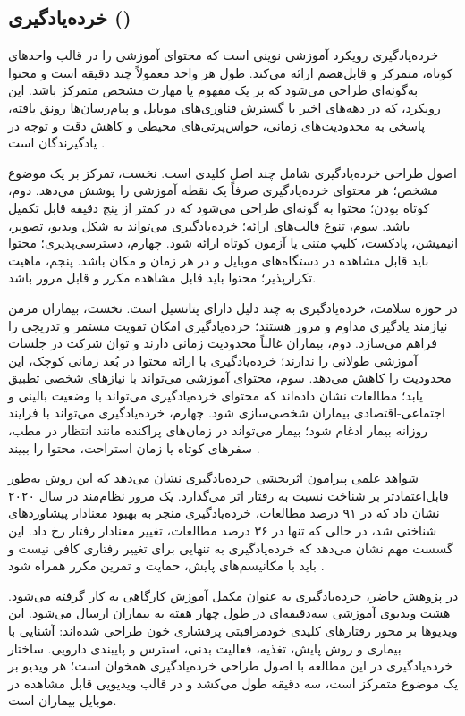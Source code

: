 \subsection{خرده‌یادگیری ()}
خرده‌یادگیری رویکرد آموزشی نوینی است که محتوای آموزشی را در قالب واحدهای کوتاه، متمرکز و قابل‌هضم ارائه می‌کند. طول هر واحد معمولاً چند دقیقه است و محتوا به‌گونه‌ای طراحی می‌شود که بر یک مفهوم یا مهارت مشخص متمرکز باشد. این رویکرد، که در دهه‌های اخیر با گسترش فناوری‌های موبایل و پیام‌رسان‌ها رونق یافته، پاسخی به محدودیت‌های زمانی، حواس‌پرتی‌های محیطی و کاهش دقت و توجه در یادگیرندگان است \cite{monib2024microlearning}.
\par
اصول طراحی خرده‌یادگیری شامل چند اصل کلیدی است. نخست، تمرکز بر یک موضوع مشخص؛ هر محتوای خرده‌یادگیری صرفاً یک نقطه آموزشی را پوشش می‌دهد. دوم، کوتاه بودن؛ محتوا به گونه‌ای طراحی می‌شود که در کمتر از پنج دقیقه قابل تکمیل باشد. سوم، تنوع قالب‌های ارائه؛ خرده‌یادگیری می‌تواند به شکل ویدیو، تصویر، انیمیشن، پادکست، کلیپ متنی یا آزمون کوتاه ارائه شود. چهارم، دسترسی‌پذیری؛ محتوا باید قابل مشاهده در دستگاه‌های موبایل و در هر زمان و مکان باشد. پنجم، ماهیت تکرارپذیر؛ محتوا باید قابل مشاهده مکرر و قابل مرور باشد.
\par
در حوزه سلامت، خرده‌یادگیری به چند دلیل دارای پتانسیل است. نخست، بیماران مزمن نیازمند یادگیری مداوم و مرور هستند؛ خرده‌یادگیری امکان تقویت مستمر و تدریجی را فراهم می‌سازد. دوم، بیماران غالباً محدودیت زمانی دارند و توان شرکت در جلسات آموزشی طولانی را ندارند؛ خرده‌یادگیری با ارائه محتوا در بُعد زمانی کوچک، این محدودیت را کاهش می‌دهد. سوم، محتوای آموزشی می‌تواند با نیازهای شخصی تطبیق یابد؛ مطالعات نشان داده‌اند که محتوای خرده‌یادگیری می‌تواند با وضعیت بالینی و اجتماعی-اقتصادی بیماران شخصی‌سازی شود. چهارم، خرده‌یادگیری می‌تواند با فرایند روزانه بیمار ادغام شود؛ بیمار می‌تواند در زمان‌های پراکنده مانند انتظار در مطب، سفرهای کوتاه یا زمان استراحت، محتوا را ببیند \cite{poorcheraghi2025microlearning,susman2024micropractice}.
\par
شواهد علمی پیرامون اثربخشی خرده‌یادگیری نشان می‌دهد که این روش به‌طور قابل‌اعتمادتر بر شناخت نسبت به رفتار اثر می‌گذارد. یک مرور نظام‌مند در سال ۲۰۲۰ نشان داد که در ۹۱ درصد مطالعات، خرده‌یادگیری منجر به بهبود معنادار پیشاوردهای شناختی شد، در حالی که تنها در ۳۶ درصد مطالعات، تغییر معنادار رفتار رخ داد. این گسست مهم نشان می‌دهد که خرده‌یادگیری به تنهایی برای تغییر رفتاری کافی نیست و باید با مکانیسم‌های پایش، حمایت و تمرین مکرر همراه شود \cite{wang2020microlearning}.
\par
در پژوهش حاضر، خرده‌یادگیری به عنوان مکمل آموزش کارگاهی به کار گرفته می‌شود. هشت ویدیوی آموزشی سه‌دقیقه‌ای در طول چهار هفته به بیماران ارسال می‌شود. این ویدیوها بر محور رفتارهای کلیدی خودمراقبتی پرفشاری خون طراحی شده‌اند: آشنایی با بیماری و روش پایش، تغذیه، فعالیت بدنی، استرس و پایبندی دارویی. ساختار خرده‌یادگیری در این مطالعه با اصول طراحی خرده‌یادگیری همخوان است؛ هر ویدیو بر یک موضوع متمرکز است، سه دقیقه طول می‌کشد و در قالب ویدیویی قابل مشاهده در موبایل بیماران است.

